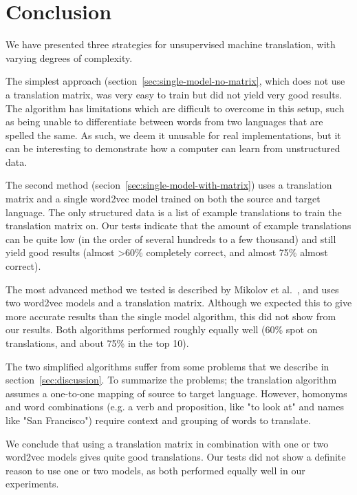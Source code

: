 \section{Conclusion}
We have presented three strategies for unsupervised machine translation, with varying degrees of complexity.

The simplest approach (section~\ref{sec:single-model-no-matrix}, which does not use a translation matrix, was very easy to train but did not yield very good results. The algorithm has limitations which are difficult to overcome in this setup, such as being unable to differentiate between words from two languages that are spelled the same. As such, we deem it unusable for real implementations, but it can be interesting to demonstrate how a computer can learn from unstructured data.

The second method (secion~\ref{sec:single-model-with-matrix}) uses a translation matrix and a single word2vec model trained on both the source and target language. The only structured data is a list of example translations to train the translation matrix on. Our tests indicate that the amount of example translations can be quite low (in the order of several hundreds to a few thousand) and still yield good results (almost >60\% completely correct, and almost 75\% almost correct).

The most advanced method we tested is described by Mikolov et al.~\cite{mikolov2013exploiting}, and uses two word2vec models and a translation matrix. Although we expected this to give more accurate results than the single model algorithm, this did not show from our results. Both algorithms performed roughly equally well (60\% spot on translations, and about 75\% in the top 10).

The two simplified algorithms suffer from some problems that we describe in section~\ref{sec:discussion}. To summarize the problems; the translation algorithm assumes a one-to-one mapping of source to target language. However, homonyms and word combinations (e.g. a verb and proposition, like "to look at" and names like "San Francisco") require context and grouping of words to translate.

We conclude that using a translation matrix in combination with one or two word2vec models gives quite good translations. Our tests did not show a definite reason to use one or two models, as both performed equally well in our experiments.